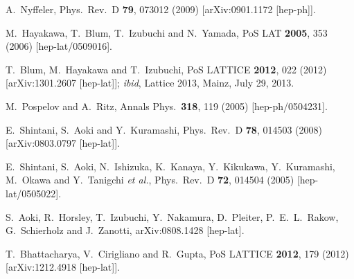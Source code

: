 \begin{thebibliography}{99}
  A.~Nyffeler,
  Phys.\ Rev.\ D {\bf 79}, 073012 (2009)
  [arXiv:0901.1172 [hep-ph]].

  M.~Hayakawa, T.~Blum, T.~Izubuchi and N.~Yamada,
  PoS LAT {\bf 2005}, 353 (2006)
  [hep-lat/0509016].

  T.~Blum, M.~Hayakawa and T.~Izubuchi,
  PoS LATTICE {\bf 2012}, 022 (2012)
  [arXiv:1301.2607 [hep-lat]]; {\it ibid}, Lattice 2013, Mainz, July 29, 2013.

  M.~Pospelov and A.~Ritz,
  Annals Phys.\  {\bf 318}, 119 (2005)
  [hep-ph/0504231].

  E.~Shintani, S.~Aoki and Y.~Kuramashi,
  Phys.\ Rev.\ D {\bf 78}, 014503 (2008)
  [arXiv:0803.0797 [hep-lat]].

  E.~Shintani, S.~Aoki, N.~Ishizuka, K.~Kanaya, Y.~Kikukawa, Y.~Kuramashi, M.~Okawa and Y.~Tanigchi {\it et al.},
  Phys.\ Rev.\ D {\bf 72}, 014504 (2005)
  [hep-lat/0505022].

  S.~Aoki, R.~Horsley, T.~Izubuchi, Y.~Nakamura, D.~Pleiter, P.~E.~L.~Rakow, G.~Schierholz and J.~Zanotti,
  arXiv:0808.1428 [hep-lat].

  T.~Bhattacharya, V.~Cirigliano and R.~Gupta,
  PoS LATTICE {\bf 2012}, 179 (2012)
  [arXiv:1212.4918 [hep-lat]].


\end{thebibliography}

